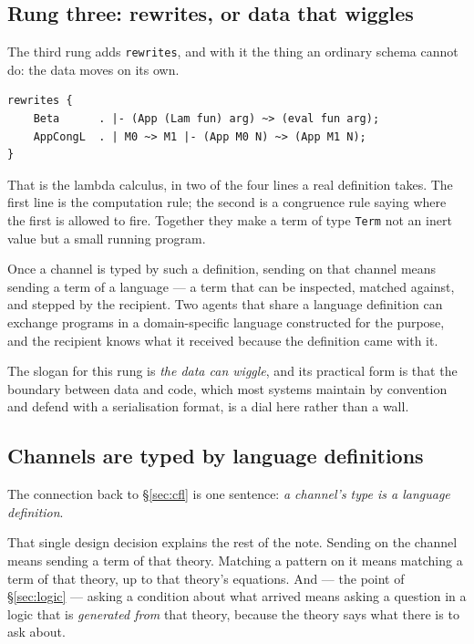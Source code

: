 \subsection{Rung three: rewrites, or data that wiggles}

The third rung adds \texttt{rewrites}, and with it the thing an ordinary schema
cannot do: the data moves on its own.

\begin{lstlisting}[language=mettail]
rewrites {
    Beta      . |- (App (Lam fun) arg) ~> (eval fun arg);
    AppCongL  . | M0 ~> M1 |- (App M0 N) ~> (App M1 N);
}
\end{lstlisting}

That is the lambda calculus, in two of the four lines a real definition takes.
The first line is the computation rule; the second is a congruence rule saying
where the first is allowed to fire. Together they make a term of type
\texttt{Term} not an inert value but a small running program.

Once a channel is typed by such a definition, sending on that channel means
sending a term of a language --- a term that can be inspected, matched against,
and stepped by the recipient. Two agents that share a language definition can
exchange programs in a domain-specific language constructed for the purpose, and
the recipient knows what it received because the definition came with it.

The slogan for this rung is \emph{the data can wiggle}, and its practical form
is that the boundary between data and code, which most systems maintain by
convention and defend with a serialisation format, is a dial here rather than a
wall.

\subsection{Channels are typed by language definitions}

The connection back to \S\ref{sec:cfl} is one sentence: \emph{a channel's type
is a language definition}.

That single design decision explains the rest of the note. Sending on the
channel means sending a term of that theory. Matching a pattern on it means
matching a term of that theory, up to that theory's equations. And --- the point
of \S\ref{sec:logic} --- asking a condition about what arrived means asking a
question in a logic that is \emph{generated from} that theory, because the
theory says what there is to ask about.

